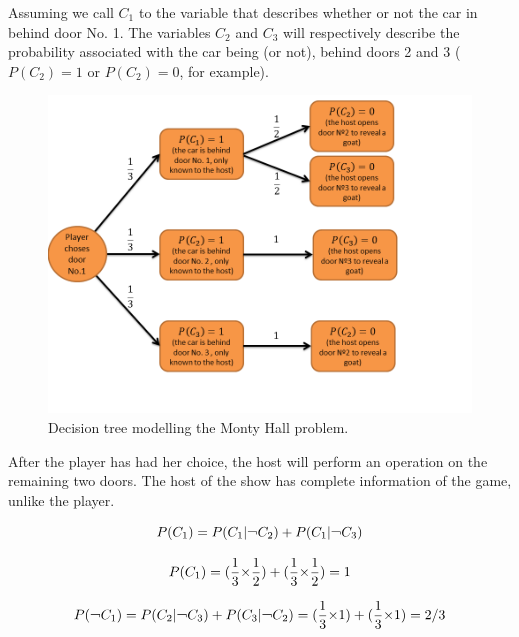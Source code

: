 
Assuming we call $C_{1}$ to the variable that describes whether or not the car in behind door No. 1. The variables $C_{2}$ and $C_{3}$ will respectively describe the probability associated with the car being (or not), behind doors 2 and 3 ($P(C_{2})=1$ or $P(C_{2})=0$, for example).

\begin{figure}[h]
\centering 
\includegraphics[scale=0.35]{Figures/monty_hall_decision_tree.png}
\caption{Decision tree modelling the Monty Hall problem. }
\label{fig:monty_hall_tree}
\end{figure}

After the player has had her choice, the host will perform an operation on the remaining two doors. The host of the show has complete information of the game, unlike the player.

\begin{equation}
\label{eq:monty_h1}
P(C_{1})=P(C_{1}|\text{\textlnot}C_{2})+P(C_{1}|\text{\textlnot}C_{3})
\end{equation}


\begin{equation}
\label{eq:monty_h2}
P(C_{1})=(\frac{1}{3}\text{\texttimes}\frac{1}{2})+(\frac{1}{3}\text{\texttimes}\frac{1}{2})=1
\end{equation}


\begin{equation}
\label{eq:monty_h3}
P(\text{\textlnot}C_{1})=P(C_{2}|\text{\textlnot}C_{3})+P(C_{3}|\text{\textlnot}C_{2})=(\frac{1}{3}\text{\texttimes}1)+(\frac{1}{3}\text{\texttimes}1)=2/3
\end{equation}

